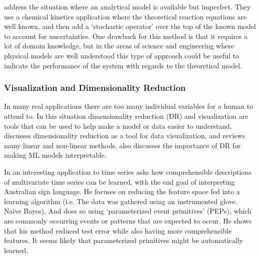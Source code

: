     \citet{Morrison2016-fz} address the situation where an analytical model is available but imperfect. They use a chemical kinetics application where the theoretical reaction equations are well known, and then add a `stochastic operator' over the top of the known model to account for uncertainties. One drawback for this method is that it requires a lot of domain knowledge, but in the areas of science and engineering where physical models are well understood this type of approach could be useful to indicate the performance of the system with regards to the theoretical model.

\subsubsection{Visualization and Dimensionality Reduction}
    In many real applications there are too many individual variables for a human to attend to. In this situation dimensionality reduction (DR) and visualization are tools that can be used to help make a model or data easier to understand. \citet{Venna2007-yj} discusses dimensionality reduction as a tool for data visualization, and reviews many linear and non-linear methods. \citet{Vellido2012-nm} also discusses the importance of DR for making ML models interpretable.

    In an interesting application to time series \citet{Kadous1999-rx} asks how comprehensible descriptions of multivariate time series can be learned, with the end goal of interpreting Australian sign language. He focuses on reducing the feature space fed into a learning algorithm (i.e. The data was gathered using an instrumented glove. Naive Bayes), And does so using `parameterized event primitives' (PEPs), which are commonly occurring events or patterns that are expected to occur. He shows that his method reduced test error while also having more comprehensible features. It seems likely that parameterized primitives might be automatically learned.

%

